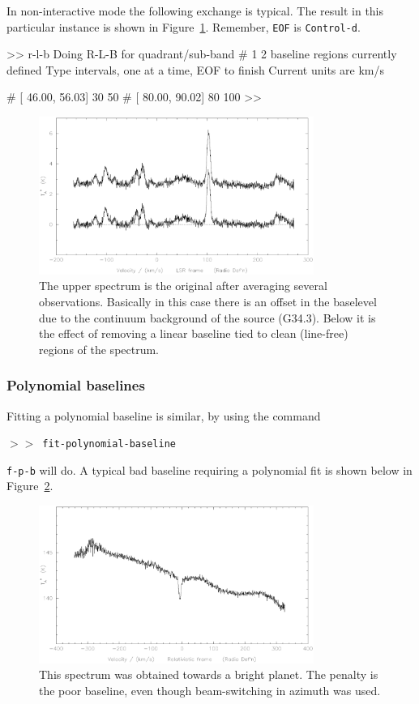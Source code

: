 \documentclass[11pt,twoside]{starlink}
\providecommand{\SP}{{$>\!>$}}
\providecommand{\ctrld}{\texttt{Control-d}}
\begin{document}
In non-interactive mode the following exchange is typical. The result
in this particular instance is shown in
Figure~\ref{fig:specx_rlb}. Remember, \texttt{EOF} is \ctrld .
\begin{terminalv}
 >> r-l-b
 Doing R-L-B for quadrant/sub-band #   1
   2 baseline regions currently defined
  Type intervals, one at a time, EOF to finish
 Current units are km/s

 # [   46.00,   56.03] 30 50
 # [   80.00,   90.02] 80 100
 >>
\end{terminalv}
%
\begin{figure}[htb]
\centering
\includegraphics[width=0.8\textwidth]{sc8_rlb}
\caption[Removing a linear baseline]
{\small{The upper spectrum is the original after averaging several
observations. Basically in this case there is an offset in the
baselevel due to the continuum background of the source (G34.3). Below
it is the effect of removing a linear baseline tied to clean
(line-free) regions of the spectrum.}  }
\label{fig:specx_rlb}
\end{figure}

\subsubsection{Polynomial baselines}
\label{sec:poly-baselines}
Fitting a polynomial baseline is similar, by using the command

\SP\ \verb|fit-polynomial-baseline|

\texttt{f-p-b} will do. A typical bad baseline requiring a polynomial fit
is shown below in Figure~\ref{fig:specx_badbaseline}.

\begin{figure}[htb]
\centering
\includegraphics[width=0.8\textwidth]{sc8_badbaseline}
\caption[Typical bad baseline]
{\small{This spectrum was obtained towards a bright planet. The
penalty is the poor baseline, even though beam-switching in azimuth
was used.  }}
\label{fig:specx_badbaseline}
\end{figure}
\end{document}
